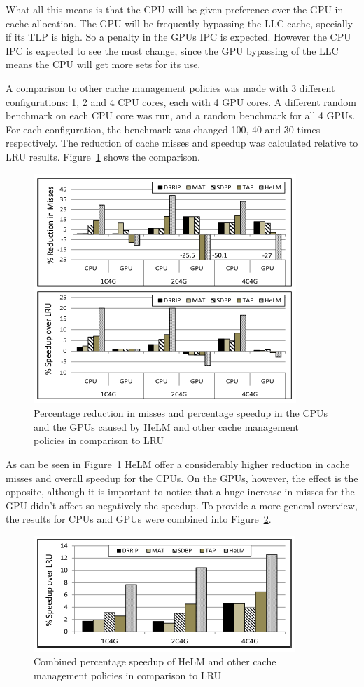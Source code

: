 \documentclass[12pt,journal,compsoc]{IEEEtran}
\begin{document}
What all this means is that the CPU will be given preference over the GPU in cache allocation. The GPU will be frequently bypassing the LLC cache, specially if its TLP is high. So a penalty in the GPUs IPC is expected. However the CPU IPC is expected to see the most change, since the GPU bypassing of the LLC means the CPU will get more sets for its use.

A comparison to other cache management policies was made with 3 different configurations: 1, 2 and 4 CPU cores, each with 4 GPU cores. A different random benchmark on each CPU core was run, and a random benchmark for all 4 GPUs. For each configuration, the benchmark was changed 100, 40 and 30 times respectively. The reduction of cache misses and speedup was calculated relative to LRU results. Figure~\ref{fig:comp} shows the comparison.

\begin{figure}[H]
	\centering
	\includegraphics[width = 8 cm]{graphics/LLCresults.png}
	\caption{Percentage reduction in misses and percentage speedup in the CPUs and the GPUs caused by HeLM and other cache management policies in comparison to LRU \cite{LLC}}\label{fig:comp}
\end{figure} 

As can be seen in Figure~\ref{fig:comp} HeLM offer a considerably higher reduction in cache misses and overall speedup for the CPUs. On the GPUs, however, the effect is the opposite, although it is important to notice that a huge increase in misses for the GPU didn't affect so negatively the speedup. To provide a more general overview, the results for CPUs and GPUs were combined into Figure~\ref{fig:comp1}.


\begin{figure}[H]
	\centering
	\includegraphics[width = 8 cm]{graphics/LLCresults2.png}
	\caption{Combined percentage speedup of HeLM and other cache management policies in comparison to LRU \cite{LLC}}\label{fig:comp1}
\end{figure} 
\end{document}
